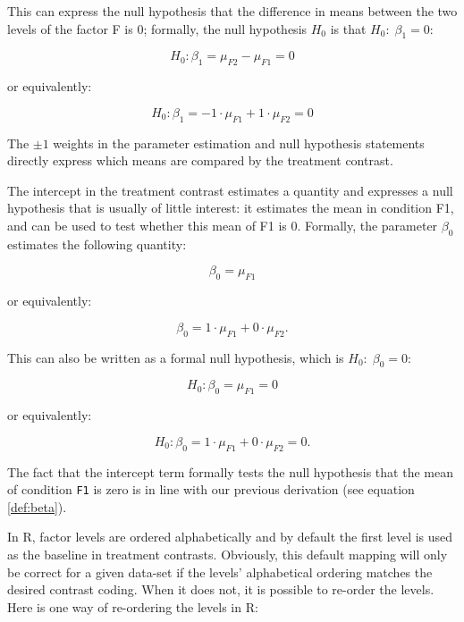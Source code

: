 \documentclass[12pt,]{krantz}
\theoremstyle{definition}
\theoremstyle{definition}
\theoremstyle{definition}
\theoremstyle{remark}
\begin{document}
This can express the null hypothesis that the difference in means between the two levels of the factor F is \(0\); formally, the null hypothesis \(H_0\) is that \(H_0: \; \beta_1 = 0\):

\begin{equation} \label{eq:f2minusf1}
H_0: \beta_1 = \mu_{F2} - \mu_{F1} = 0
\end{equation}

or equivalently:

\begin{equation}
H_0: \beta_1 = - 1 \cdot \mu_{F1} + 1 \cdot \mu_{F2} = 0
\end{equation}

The \(\pm 1\) weights in the parameter estimation and null hypothesis statements directly express which means are compared by the treatment contrast.

The intercept in the treatment contrast estimates a quantity and expresses a null hypothesis that is usually of little interest: it estimates the mean in condition F1, and can be used to test whether this mean of F1 is \(0\).
Formally, the parameter \(\beta_0\) estimates the following quantity:

\begin{equation}
\beta_0 = \mu_{F1}
\end{equation}

\noindent
or equivalently:

\begin{equation}
\beta_0 = 1 \cdot \mu_{F1} + 0 \cdot \mu_{F2} .
\end{equation}

This can also be written as a formal null hypothesis, which is \(H_0: \; \beta_0 = 0\):

\begin{equation}
H_0: \beta_0 = \mu_{F1} = 0
\end{equation}

\noindent
or equivalently:

\begin{equation} \label{eq:trmtcontrfirstmention}
H_0: \beta_0 = 1 \cdot \mu_{F1} + 0 \cdot \mu_{F2} = 0 .
\end{equation}

\noindent
The fact that the intercept term formally tests the null hypothesis that the mean of condition \texttt{F1} is zero is in line with our previous derivation (see equation \ref{def:beta}).

In R, factor levels are ordered alphabetically and by default the first level is used as the baseline in treatment contrasts. Obviously, this default mapping will only be correct for a given data-set if the levels' alphabetical ordering matches the desired contrast coding. When it does not, it is possible to re-order the levels. Here is one way of re-ordering the levels in R:
\end{document}

